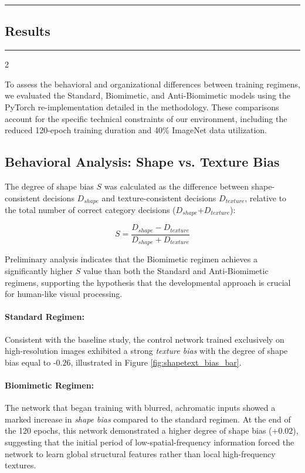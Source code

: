{\color{gray}\hrule}
\begin{center}
\section{Results}
\bigskip
\end{center}
{\color{gray}\hrule}
\begin{multicols}{2}

To assess the behavioral and organizational differences between training regimens, we evaluated the Standard, Biomimetic, and Anti-Biomimetic models using the PyTorch re-implementation detailed in the methodology. These comparisons account for the specific technical constraints of our environment, including the reduced 120-epoch training duration and 40\% ImageNet\cite{deng2009imagenet} data utilization.

\subsection{Behavioral Analysis: Shape vs. Texture Bias}

The degree of shape bias $S$ was calculated as the difference between shape-consistent decisions $D_{shape}$ and texture-consistent decisions $D_{texture}$, relative to the total number of correct category decisions ($D_{shape}$+$D_{texture}$):



\begin{equation}
S = \frac{D_{shape} - D_{texture}}{D_{shape} + D_{texture}}
\end{equation}

Preliminary analysis indicates that the Biomimetic regimen achieves a significantly higher $S$ value than both the Standard and Anti-Biomimetic regimens, supporting the hypothesis that the developmental approach is crucial for human-like visual processing.


\paragraph{Standard Regimen:} Consistent with the baseline study, the control network trained exclusively on high-resolution images exhibited a strong \textit{texture bias} with the degree of shape bias equal to -$0.26$, illustrated in Figure \ref{fig:shapetext_bias_bar}.
    
\paragraph{Biomimetic Regimen:} The network that began training with blurred, achromatic inputs showed a marked increase in \textit{shape bias} compared to the standard regimen. At the end of the 120 epochs, this network demonstrated a higher degree of shape bias (+$0.02$), suggesting that the initial period of low-spatial-frequency information forced the network to learn global structural features rather than local high-frequency textures.


\end{multicols}
